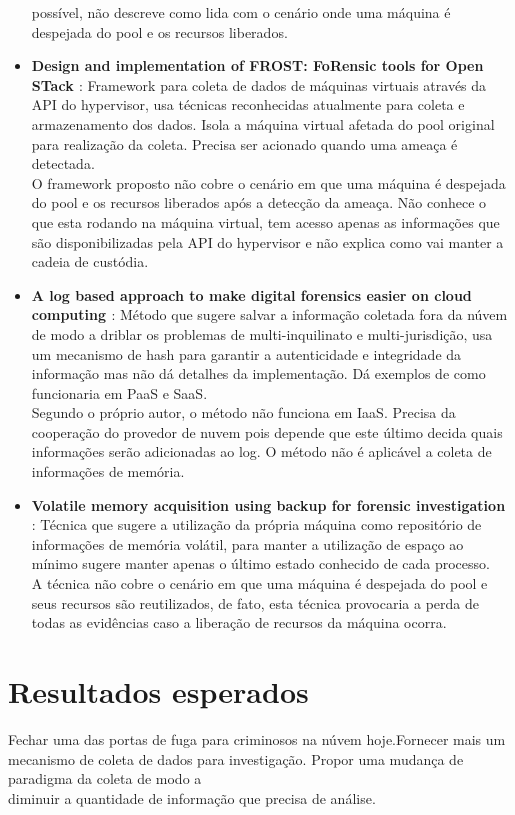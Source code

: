 \documentclass[12pt,				%
	openright,			%
	oneside,			%
	a4paper,			%
	english,			%
	brazil				%
	]{abntex2}
\begin{document}
\begin{itemize}
 possível, não descreve como lida com o cenário onde uma máquina é despejada do pool e os recursos liberados.
 \item \textbf{Design and implementation of FROST: FoRensic tools for Open STack \cite{Dykstra2013} }: Framework para coleta de dados de máquinas virtuais através da API do 
 hypervisor, usa técnicas reconhecidas atualmente para coleta e armazenamento dos dados. Isola a máquina virtual afetada do pool original para realização da coleta. Precisa 
 ser acionado quando uma ameaça é detectada.\\
 O framework proposto não cobre o cenário em que uma máquina é despejada do pool e os recursos liberados após a detecção da ameaça. Não conhece o que esta rodando na máquina 
 virtual, tem acesso apenas as informações que são disponibilizadas pela API do hypervisor e não explica como vai manter a cadeia de custódia.
 \item \textbf{A log based approach to make digital forensics easier on cloud computing \cite{Sang2013} }: Método que sugere salvar a informação coletada fora da núvem de modo a driblar
 os problemas de multi-inquilinato e multi-jurisdição, usa um mecanismo de hash para garantir a autenticidade e integridade da informação mas não dá detalhes da implementação. 
 Dá exemplos de como funcionaria em PaaS e SaaS.\\
 Segundo o próprio autor, o método não funciona em IaaS. Precisa da cooperação do provedor de nuvem pois depende que este último decida quais informações serão adicionadas ao log.
 O método não é aplicável a coleta de informações de memória.
\item \textbf{Volatile memory acquisition using backup for forensic investigation \cite{Dezfouli2012} }: Técnica que sugere a utilização da própria máquina
como repositório de informações de memória volátil, para manter a utilização de espaço ao mínimo sugere manter apenas o último estado conhecido de cada processo.\\
A técnica não cobre o cenário em que uma máquina é despejada do pool e seus recursos são reutilizados, de fato, esta técnica provocaria a perda de todas as evidências caso a 
liberação de recursos da máquina ocorra.
\end{itemize}

\chapter{Resultados esperados} \label{chap:result}
Fechar uma das portas de fuga para criminosos na núvem hoje.Fornecer mais um mecanismo de coleta de dados para investigação. Propor uma mudança de paradigma da coleta de modo a \\
diminuir a quantidade de informação que precisa de análise.
\end{document}
